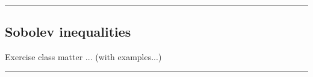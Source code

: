 \rule{0.31\textwidth}{0.2pt}


\subsection{\color{red}Sobolev inequalities}


Exercise class matter ... (with examples...)







\rule{0.31\textwidth}{1pt}

\newpage










